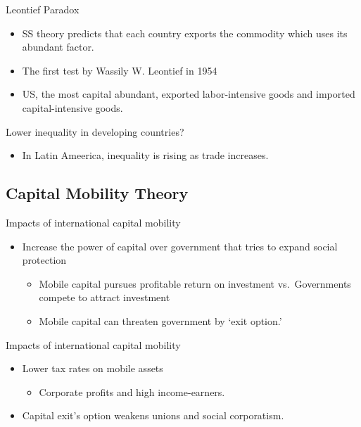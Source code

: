 \documentclass[
]{book}
\providecommand{\tightlist}{%
  \setlength{\itemsep}{0pt}\setlength{\parskip}{0pt}}
\begin{document}
Leontief Paradox

\begin{itemize}
\item
  SS theory predicts that each country exports the commodity which uses its abundant factor.
\item
  The first test by Wassily W. Leontief in 1954
\item
  US, the most capital abundant, exported labor-intensive goods and imported capital-intensive goods.
\end{itemize}

Lower inequality in developing countries?

\begin{itemize}
\tightlist
\item
  In Latin Ameerica, inequality is rising as trade increases.
\end{itemize}

\hypertarget{capital-mobility-theory}{%
\subsection{Capital Mobility Theory}\label{capital-mobility-theory}}

Impacts of international capital mobility

\begin{itemize}
\item
  Increase the power of capital over government that tries to expand social protection

  \begin{itemize}
  \item
    Mobile capital pursues profitable return on investment vs.~Governments compete to attract investment
  \item
    Mobile capital can threaten government by `exit option.'
  \end{itemize}
\end{itemize}

Impacts of international capital mobility

\begin{itemize}
\item
  Lower tax rates on mobile assets

  \begin{itemize}
  \tightlist
  \item
    Corporate profits and high income-earners.
  \end{itemize}
\item
  Capital exit's option weakens unions and social corporatism.
\end{itemize}
\end{document}
